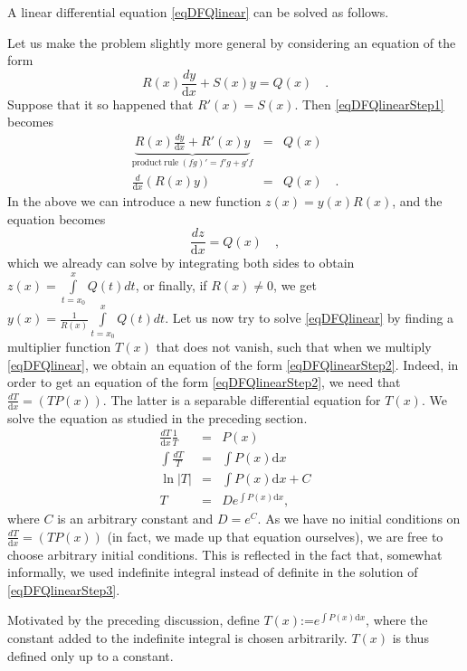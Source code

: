 \documentclass[12pt]{book}
\newcommand{\diff}{\text{d}}
\newcommand{\eqdef}{\textbf{:=}}
\begin{document}
A linear differential equation \eqref{eqDFQlinear} can be solved as follows. 

Let us make the problem slightly more general by considering an equation of the form 
\begin{equation}\label{eqDFQlinearStep1}
R(x)\frac{dy}{\diff x} + S(x)y=Q(x)\quad .
\end{equation}
Suppose that it so happened that $R'(x)=S(x)$. Then \eqref{eqDFQlinearStep1} becomes
\begin{equation}\label{eqDFQlinearStep2}
\begin{array}{rcl}
\underbrace{R(x)\frac{dy}{\diff x} + R'(x)y}_{\mathrm{product~rule~}(fg)'=f'g+g'f}&=&Q(x)\\
\frac{d}{\diff x} \left(R(x)y \right)&=& Q(x)\quad .
\end{array}
\end{equation}
In the above we can introduce a new function $z(x)= y(x)R(x)$, and the equation becomes 
\[
\frac{dz}{\diff x}= Q(x)\quad ,
\]
which we already can solve by integrating both sides to obtain $z(x)= \int\limits_{t=x_0}^x Q(t)dt $, or finally, if $R(x)\neq 0$, we get $y(x)= \frac{1}{R(x)}\int\limits_{t=x_0}^x Q(t)dt $.
Let us now try to solve \eqref{eqDFQlinear} by finding a multiplier function $T(x)$ that does not vanish, such that when we multiply \eqref{eqDFQlinear}, we obtain an equation of the form \eqref{eqDFQlinearStep2}. Indeed, in order to get an equation of the form \eqref{eqDFQlinearStep2}, we need that $\frac{dT}{\diff x}= (TP(x))$. The latter is a separable differential equation for $T(x)$.  We solve the equation as studied in the preceding section.
\begin{equation}\label{eqDFQlinearStep3}
\begin{array}{rcl}
\frac{dT}{\diff x}\frac{1}{T}&=&P(x)\\
\int\frac{dT}{T}&=&\int P(x)\diff x\\
\ln |T|&=&  \int P(x)\diff x+C\\
T&=&De^{\int P(x)\diff x}, 
\end{array}
\end{equation}
where $C$ is an arbitrary constant and $D=e^C$. As we have no initial conditions on $\frac{dT}{\diff x}= (TP(x))$ (in fact, we made up that equation ourselves), we are free to choose arbitrary initial conditions. This is reflected in the fact that, somewhat informally, we used indefinite integral instead of definite in the solution of \eqref{eqDFQlinearStep3}.

Motivated by the preceding discussion, define $T(x)\eqdef e^{\int P(x)\diff x}$, where the constant added to the indefinite integral is chosen arbitrarily. $T(x)$ is thus defined only up to a constant.
\end{document}
